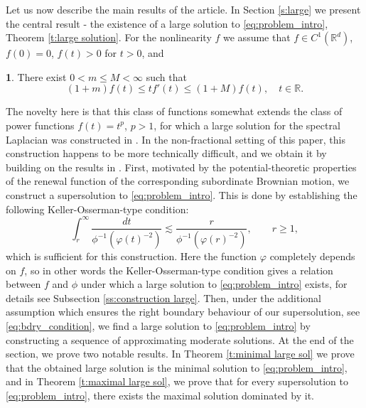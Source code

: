 \documentclass[12pt,a4paper,onecolumn]{amsart}
\makeatletter
\theoremstyle{definition}
\newtheorem*{assumption*}{\assumptionnumber}
\providecommand{\assumptionnumber}{}
\newenvironment{assumption}[2]
{%
	\renewcommand{\assumptionnumber}{(\textbf{#1#2})}%
	\begin{assumption*}%
		\protected@edef\@currentlabel{(\textbf{#1#2})}%
	}
	{%
	\end{assumption*}
}
\newcommand{\R}{\mathbb{R}}
\newcommand{\1}{\mathbf 1}
\numberwithin{equation}{section}
\makeatother
\begin{document}
Let us now describe the main results of the article. In Section \ref{s:large} we present the central result - the existence of a large solution to \eqref{eq:problem_intro}, Theorem \ref{t:large solution}. For the nonlinearity $f$ we assume that $f\in C^1(\R^d)$, $f(0)=0$, $f(t)>0$ for $t>0$, and
\begin{assumption}{F}{}\label{F_intro}
	There exist $0<m\le M<\infty$ such that
	$$ (1+m)f(t)\le tf'(t)\le (1+M)f(t),\quad t\in \R.$$
\end{assumption}
\noindent The novelty here is that this class of functions somewhat extends the class of power functions $f(t)=t^p$, $p>1$, for which a large solution for the spectral Laplacian was constructed in \cite{AbaDupaNonhomo2017}. In the non-fractional setting of this paper, this construction happens to be more technically difficult, and we obtain it by building on the results in \cite{AbaDupaNonhomo2017,semilinear_cvw,Aba17}. First, motivated by the potential-theoretic properties of the renewal function of the corresponding subordinate Brownian motion, we construct a supersolution to \eqref{eq:problem_intro}. This is done by establishing the following Keller-Osserman-type condition: 
 \begin{equation*}
\int_r^\infty \frac{dt}{\phi^{-1}(\varphi(t)^{-2})}\lesssim\frac{r}{\phi^{-1}(\varphi(r)^{-2})},\qquad r\ge 1,
\end{equation*}
which is sufficient for this construction. Here the function $\varphi$ completely depends on $f$, so in other words the Keller-Osserman-type condition gives a relation between $f$ and $\phi$ under which a large solution to \eqref{eq:problem_intro} exists, for details see Subsection \ref{ss:construction large}. Then, under the additional assumption which ensures the right boundary behaviour of our supersolution, see \eqref{eq:bdry_condition}, we find a large solution to \eqref{eq:problem_intro} by constructing a sequence of approximating moderate solutions. At the end of the section, we prove two notable results. In Theorem \ref{t:minimal large sol} we prove that the obtained large solution is the minimal solution to \eqref{eq:problem_intro}, and in Theorem \ref{t:maximal large sol}, we prove that for every supersolution to \eqref{eq:problem_intro}, there exists the maximal solution dominated by it.
\end{document}
